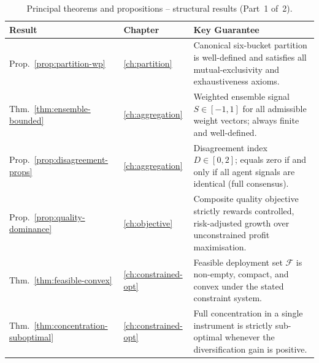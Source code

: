 \documentclass[12pt,openany]{book}
\numberwithin{equation}{chapter}
\theoremstyle{plain}
\theoremstyle{definition}
\theoremstyle{remark}
\numberwithin{equation}{chapter}
\theoremstyle{plain}
\begin{document}
\begin{table}[H]
\centering
\caption{Principal theorems and propositions -- structural results (Part~1 of~2).}
\label{tab:summary-results-1}
\small
\begin{tabularx}{\linewidth}{@{} l l X @{}}
\toprule
\textbf{Result} & \textbf{Chapter} & \textbf{Key Guarantee} \\
\midrule
Prop.~\ref{prop:partition-wp}
  & \ref{ch:partition}
  & Canonical six-bucket partition is well-defined and satisfies
    all mutual-exclusivity and exhaustiveness axioms. \\[3pt]
Thm.~\ref{thm:ensemble-bounded}
  & \ref{ch:aggregation}
  & Weighted ensemble signal $S\in[-1,1]$ for all admissible
    weight vectors; always finite and well-defined. \\[3pt]
Prop.~\ref{prop:disagreement-props}
  & \ref{ch:aggregation}
  & Disagreement index $D\in[0,2]$; equals zero if and only if
    all agent signals are identical (full consensus). \\[3pt]
Prop.~\ref{prop:quality-dominance}
  & \ref{ch:objective}
  & Composite quality objective strictly rewards controlled,
    risk-adjusted growth over unconstrained profit maximisation. \\[3pt]
Thm.~\ref{thm:feasible-convex}
  & \ref{ch:constrained-opt}
  & Feasible deployment set $\mathcal{F}$ is non-empty, compact,
    and convex under the stated constraint system. \\[3pt]
Thm.~\ref{thm:concentration-suboptimal}
  & \ref{ch:constrained-opt}
  & Full concentration in a single instrument is strictly
    sub-optimal whenever the diversification gain is positive. \\
\bottomrule
\end{tabularx}
\end{table}
\end{document}

